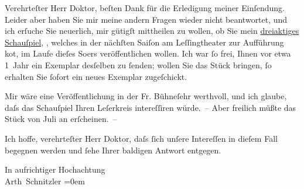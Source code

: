 \pstart{}Verehrteſter Herr Doktor,\pend\vspace{0.5em}
\pstart
           beſten Dank für die Erledigung meiner Einſendung. Leider aber haben Sie mir meine
               andern Fragen wieder nicht beantwortet, und ich erſuche Sie neuerlich, mir gütigſt
                  mitthei{\pb}len zu wollen, ob Sie mein \uline{dreiaktiges Schauſpiel}, , welches in der nächſten Saiſon am Leſſingtheater zur Aufführung ko{\geminationm}t, im Laufe
               dieſes So{\geminationm}ers veröffentlichen wollen. Ich war{ }ſo frei,
               Ihnen vor etwa {\pb}1 Jahr ein Exemplar desſelben zu{ }ſenden;
               wollen Sie das Stück bringen,{ }ſo erhalten Sie{ }ſofort ein neues Exemplar zugeſchickt.\pend
           
\pstart
           Mir wäre eine Veröffentlichung in der Fr. Bühneſehr werthvoll, und ich glaube, daſs das Schauſpiel
               Ihren Leſerkreis intereſſiren {\pb}würde. – Aber freilich müßte
               das Stück von Juli an erſcheinen. –\pend
           
\pstart
           Ich hoffe, verehrteſter Herr Doktor, daſs{ }ſich unſere Intereſſen in dieſem Fall
               begegnen werden und{ }ſehe Ihrer baldigen Antwort entgegen.\pend
           
\pstart
           In aufrichtiger Hochachtung{\\[\baselineskip]}\spacefill\mbox{Arth Schnitzler}\pend
           \leftskip=0em{}\endnumbering{}  \newcommand{\dateiname}{L00222}\newcommand{\titel}{Arthur Schnitzler an Wilhelm Bölsche, 14. 6. 1893}\newcommand{\editorInnen}{Martin Anton Müller und Gerd-Hermann Susen}
